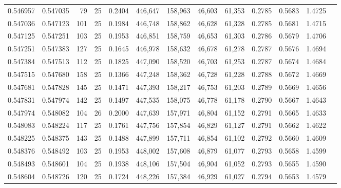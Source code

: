 \begin{tabular}{rrrrrrrrrrrrr}
0.546957 & 0.547035 &    79 &  25 &                                     0.2404 & 446,647 & 158,963 &  46,603 &  61,353 & 0.2785 & 0.5683 & 1.4725 \\
0.547036 & 0.547123 &   101 &  25 &                                     0.1984 & 446,748 & 158,862 &  46,628 &  61,328 & 0.2785 & 0.5681 & 1.4715 \\
0.547125 & 0.547251 &   103 &  25 &                                     0.1953 & 446,851 & 158,759 &  46,653 &  61,303 & 0.2786 & 0.5679 & 1.4706 \\
0.547251 & 0.547383 &   127 &  25 &                                     0.1645 & 446,978 & 158,632 &  46,678 &  61,278 & 0.2787 & 0.5676 & 1.4694 \\
0.547384 & 0.547513 &   112 &  25 &                                     0.1825 & 447,090 & 158,520 &  46,703 &  61,253 & 0.2787 & 0.5674 & 1.4684 \\
0.547515 & 0.547680 &   158 &  25 &                                     0.1366 & 447,248 & 158,362 &  46,728 &  61,228 & 0.2788 & 0.5672 & 1.4669 \\
0.547681 & 0.547828 &   145 &  25 &                                     0.1471 & 447,393 & 158,217 &  46,753 &  61,203 & 0.2789 & 0.5669 & 1.4656 \\
0.547831 & 0.547974 &   142 &  25 &                                     0.1497 & 447,535 & 158,075 &  46,778 &  61,178 & 0.2790 & 0.5667 & 1.4643 \\
0.547974 & 0.548082 &   104 &  26 &                                     0.2000 & 447,639 & 157,971 &  46,804 &  61,152 & 0.2791 & 0.5665 & 1.4633 \\
0.548083 & 0.548224 &   117 &  25 &                                     0.1761 & 447,756 & 157,854 &  46,829 &  61,127 & 0.2791 & 0.5662 & 1.4622 \\
0.548225 & 0.548375 &   143 &  25 &                                     0.1488 & 447,899 & 157,711 &  46,854 &  61,102 & 0.2792 & 0.5660 & 1.4609 \\
0.548376 & 0.548492 &   103 &  25 &                                     0.1953 & 448,002 & 157,608 &  46,879 &  61,077 & 0.2793 & 0.5658 & 1.4599 \\
0.548493 & 0.548601 &   104 &  25 &                                     0.1938 & 448,106 & 157,504 &  46,904 &  61,052 & 0.2793 & 0.5655 & 1.4590 \\
0.548604 & 0.548726 &   120 &  25 &                                     0.1724 & 448,226 & 157,384 &  46,929 &  61,027 & 0.2794 & 0.5653 & 1.4579 \\

\end{tabular}
